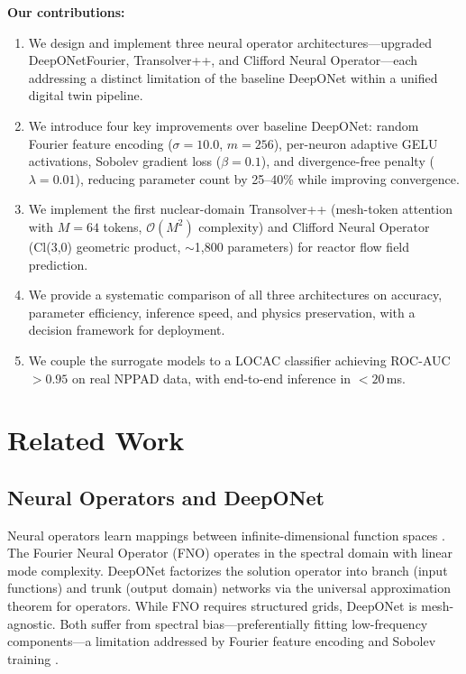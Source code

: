 \documentclass[conference]{IEEEtran}
\begin{document}
\textbf{Our contributions:}
\begin{enumerate}
    \item We design and implement three neural operator architectures---upgraded DeepONetFourier, Transolver++, and Clifford Neural Operator---each addressing a distinct limitation of the baseline DeepONet within a unified digital twin pipeline.
    \item We introduce four key improvements over baseline DeepONet: random Fourier feature encoding ($\sigma = 10.0$, $m = 256$), per-neuron adaptive GELU activations, Sobolev gradient loss ($\beta = 0.1$), and divergence-free penalty ($\lambda = 0.01$), reducing parameter count by 25--40\% while improving convergence.
    \item We implement the first nuclear-domain Transolver++ (mesh-token attention with $M = 64$ tokens, $\mathcal{O}(M^2)$ complexity) and Clifford Neural Operator (Cl(3,0) geometric product, $\sim$1,800 parameters) for reactor flow field prediction.
    \item We provide a systematic comparison of all three architectures on accuracy, parameter efficiency, inference speed, and physics preservation, with a decision framework for deployment.
    \item We couple the surrogate models to a LOCAC classifier achieving ROC-AUC $> 0.95$ on real NPPAD data, with end-to-end inference in $< 20$\,ms.
\end{enumerate}

\section{Related Work}
\label{sec:related}

\subsection{Neural Operators and DeepONet}
Neural operators learn mappings between infinite-dimensional function spaces \cite{lu2022comprehensive}. The Fourier Neural Operator (FNO) \cite{li2021fno} operates in the spectral domain with linear mode complexity. DeepONet \cite{lu2021deeponet, chen1995} factorizes the solution operator into branch (input functions) and trunk (output domain) networks via the universal approximation theorem for operators. While FNO requires structured grids, DeepONet is mesh-agnostic. Both suffer from spectral bias---preferentially fitting low-frequency components---a limitation addressed by Fourier feature encoding \cite{tancik2020ffn} and Sobolev training \cite{son2021sobolev}.
\end{document}
